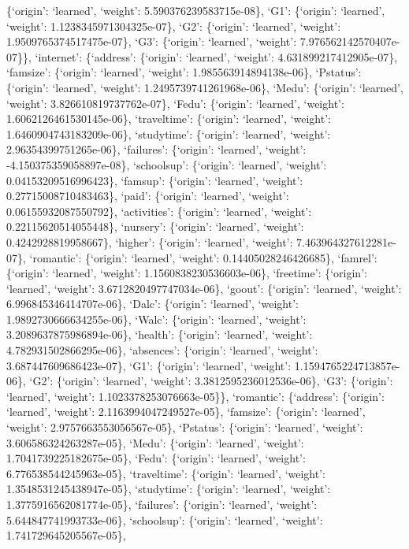 \documentclass[
]{article}
\begin{document}
\{`origin': `learned', `weight': 5.590376239583715e-08\}, `G1':
\{`origin': `learned', `weight': 1.1238345971304325e-07\}, `G2':
\{`origin': `learned', `weight': 1.9509765374517475e-07\}, `G3':
\{`origin': `learned', `weight': 7.976562142570407e-07\}\}, `internet':
\{`address': \{`origin': `learned', `weight': 4.631899217412905e-07\},
`famsize': \{`origin': `learned', `weight': 1.985563914894138e-06\},
`Pstatus': \{`origin': `learned', `weight': 1.2495739741261968e-06\},
`Medu': \{`origin': `learned', `weight': 3.826610819737762e-07\},
`Fedu': \{`origin': `learned', `weight': 1.6062126461530145e-06\},
`traveltime': \{`origin': `learned', `weight': 1.6460904743183209e-06\},
`studytime': \{`origin': `learned', `weight': 2.96354399751265e-06\},
`failures': \{`origin': `learned', `weight': -4.150375359058897e-08\},
`schoolsup': \{`origin': `learned', `weight': 0.04153209516996423\},
`famsup': \{`origin': `learned', `weight': 0.27715008710483463\},
`paid': \{`origin': `learned', `weight': 0.06155932087550792\},
`activities': \{`origin': `learned', `weight': 0.22115620514055448\},
`nursery': \{`origin': `learned', `weight': 0.4242928819958667\},
`higher': \{`origin': `learned', `weight': 7.463964327612281e-07\},
`romantic': \{`origin': `learned', `weight': 0.14405028246426685\},
`famrel': \{`origin': `learned', `weight': 1.1560838230536603e-06\},
`freetime': \{`origin': `learned', `weight': 3.6712820497747034e-06\},
`goout': \{`origin': `learned', `weight': 6.996845346414707e-06\},
`Dalc': \{`origin': `learned', `weight': 1.9892730666634255e-06\},
`Walc': \{`origin': `learned', `weight': 3.2089637875986894e-06\},
`health': \{`origin': `learned', `weight': 4.782931502866295e-06\},
`absences': \{`origin': `learned', `weight': 3.687447609686423e-07\},
`G1': \{`origin': `learned', `weight': 1.1594765224713857e-06\}, `G2':
\{`origin': `learned', `weight': 3.3812595236012536e-06\}, `G3':
\{`origin': `learned', `weight': 1.1023378253076663e-05\}\}, `romantic':
\{`address': \{`origin': `learned', `weight': 2.1163994047249527e-05\},
`famsize': \{`origin': `learned', `weight': 2.9757663553056567e-05\},
`Pstatus': \{`origin': `learned', `weight': 3.606586324263287e-05\},
`Medu': \{`origin': `learned', `weight': 1.7041739225182675e-05\},
`Fedu': \{`origin': `learned', `weight': 6.776538544245963e-05\},
`traveltime': \{`origin': `learned', `weight': 1.3548531245438947e-05\},
`studytime': \{`origin': `learned', `weight': 1.3775916562081774e-05\},
`failures': \{`origin': `learned', `weight': 5.644847741993733e-06\},
`schoolsup': \{`origin': `learned', `weight': 1.741729645205567e-05\},
\end{document}
